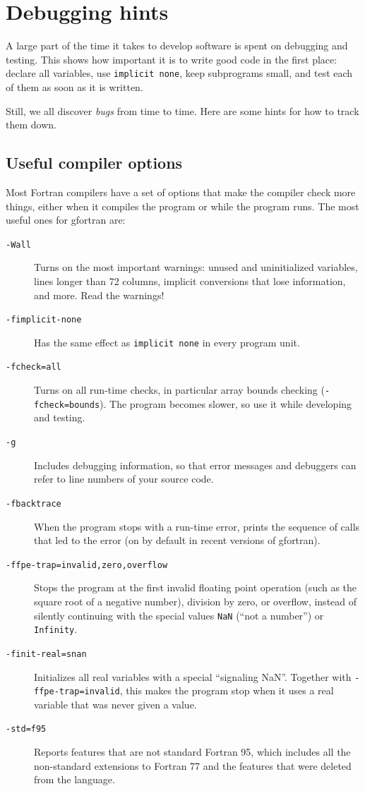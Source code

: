 \chapter{Debugging hints}

A large part of the time it takes to develop software is spent on debugging and testing. This shows how important it is to write good code in the first place: declare all variables, use \texttt{implicit none}, keep subprograms small, and test each of them as soon as it is written.

Still, we all discover \emph{bugs} from time to time. Here are some hints for how to track them down.

\section{Useful compiler options}

Most Fortran compilers have a set of options that make the compiler check more things, either when it compiles the program or while the program runs. The most useful ones for gfortran are:

\begin{description}
    \item[\texttt{-Wall}] Turns on the most important warnings: unused and uninitialized variables, lines longer than 72 columns, implicit conversions that lose information, and more. Read the warnings!
    \item[\texttt{-fimplicit-none}] Has the same effect as \texttt{implicit none} in every program unit.
    \item[\texttt{-fcheck=all}] Turns on all run-time checks, in particular array bounds checking (\texttt{-fcheck=bounds}). The program becomes slower, so use it while developing and testing.
    \item[\texttt{-g}] Includes debugging information, so that error messages and debuggers can refer to line numbers of your source code.
    \item[\texttt{-fbacktrace}] When the program stops with a run-time error, prints the sequence of calls that led to the error (on by default in recent versions of gfortran).
    \item[\texttt{-ffpe-trap=invalid,zero,overflow}] Stops the program at the first invalid floating point operation (such as the square root of a negative number), division by zero, or overflow, instead of silently continuing with the special values \texttt{NaN} (``not a number'') or \texttt{Infinity}.
    \item[\texttt{-finit-real=snan}] Initializes all real variables with a special ``signaling NaN''. Together with \texttt{-ffpe-trap=invalid}, this makes the program stop when it uses a real variable that was never given a value.
    \item[\texttt{-std=f95}] Reports features that are not standard Fortran 95, which includes all the non-standard extensions to Fortran 77 and the features that were deleted from the language.
\end{description}


